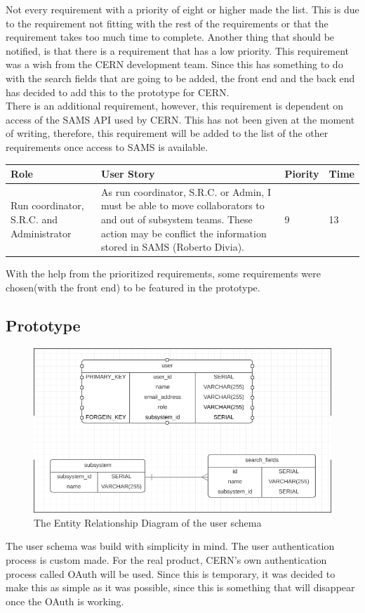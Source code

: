 \documentclass[paper=a4, fontsize=11pt,twoside]{scrartcl}	%
\begin{document}
Not every requirement with a priority of eight or higher made the list. This is due to the requirement not fitting with the rest of the requirements or that the requirement takes too much time to complete. Another thing that should be notified, is that there is a requirement that has a low priority. This requirement was a wish from the CERN development team. Since this has something to do with the search fields that are going to be added, the front end and the back end has decided to add this to the prototype for CERN.   \\

There is an additional requirement, however, this requirement is dependent on access of the SAMS API used by CERN. This has not been given at the moment of writing, therefore, this requirement will be added to the list of the other requirements once access to SAMS is available. \\

\begin{longtable}{ | p{3cm} | p{8cm} | p{1cm} | l |}
\hline
Role & User Story & Piority & Time \\ \hline
Run coordinator, S.R.C. and Administrator &  As run coordinator, S.R.C. or Admin, I must be able to move collaborators to and out of subsystem teams. These action may be conflict the information stored in SAMS (Roberto Divia). & 9 & 13 \\ \hline
\end{longtable}

With the help from the prioritized requirements, some requirements were chosen(with the front end) to be featured in the prototype. 
\newpage
\subsection{Prototype}
\begin{figure}[H]
\includegraphics[scale=0.5]{erd_user}
\caption{The Entity Relationship Diagram of the user schema}
\end{figure}
The user schema was build with simplicity in mind. The user authentication process is custom made. For the real product, CERN's own authentication process called OAuth will be used. Since this is temporary, it was decided to make this as simple as it was possible, since this is something that will disappear once the OAuth is working. 
\end{document}

